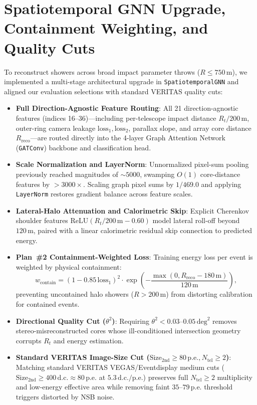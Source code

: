 \documentclass[11pt,a4paper]{article}
\begin{document}
\section{Spatiotemporal GNN Upgrade, Containment Weighting, and Quality Cuts}
To reconstruct showers across broad impact parameter throws ($R \le 750\,\text{m}$), we implemented a multi-stage architectural upgrade in \texttt{SpatiotemporalGNN} and aligned our evaluation selections with standard VERITAS quality cuts:
\begin{itemize}
    \item \textbf{Full Direction-Agnostic Feature Routing}: All 21 direction-agnostic features (indices 16--36)—including per-telescope impact distance $R_t/200\,\text{m}$, outer-ring camera leakage $\text{loss}_1, \text{loss}_2$, parallax slope, and array core distance $R_\text{reco}$—are routed directly into the 4-layer Graph Attention Network (\texttt{GATConv}) backbone and classification head.
    \item \textbf{Scale Normalization and LayerNorm}: Unnormalized pixel-sum pooling previously reached magnitudes of $\sim 5000$, swamping $O(1)$ core-distance features by $>3000\times$. Scaling graph pixel sums by $1/469.0$ and applying \texttt{LayerNorm} restores gradient balance across feature scales.
    \item \textbf{Lateral-Halo Attenuation and Calorimetric Skip}: Explicit Cherenkov shoulder features $\text{ReLU}(R_t/200\,\text{m} - 0.60)$ model lateral roll-off beyond $120\,\text{m}$, paired with a linear calorimetric residual skip connection to predicted energy.
    \item \textbf{Plan~\#2 Containment-Weighted Loss}: Training energy loss per event is weighted by physical containment:
    \begin{equation}
        w_\text{contain} = (1 - 0.85\,\text{loss}_1)^2 \cdot \exp\!\left(-\frac{\max(0, R_\text{reco} - 180\,\text{m})}{120\,\text{m}}\right),
    \end{equation}
    preventing uncontained halo showers ($R > 200\,\text{m}$) from distorting calibration for contained events.
    \item \textbf{Directional Quality Cut ($\theta^2$)}: Requiring $\theta^2 < 0.03\text{--}0.05\,\text{deg}^2$ removes stereo-misreconstructed cores whose ill-conditioned intersection geometry corrupts $R_t$ and energy estimation.
    \item \textbf{Standard VERITAS Image-Size Cut ($\text{Size}_{2\text{nd}} \ge 80\,\text{p.e.}, N_\text{tel} \ge 2$)}: Matching standard VERITAS VEGAS/Eventdisplay medium cuts ($\text{Size}_{2\text{nd}} \ge 400\,\text{d.c.} \approx 80\,\text{p.e.}$ at $5.3\,\text{d.c./p.e.}$) preserves full $N_\text{tel} \ge 2$ multiplicity and low-energy effective area while removing faint $35\text{--}79\,\text{p.e.}$ threshold triggers distorted by NSB noise.

\end{itemize}
\end{document}
